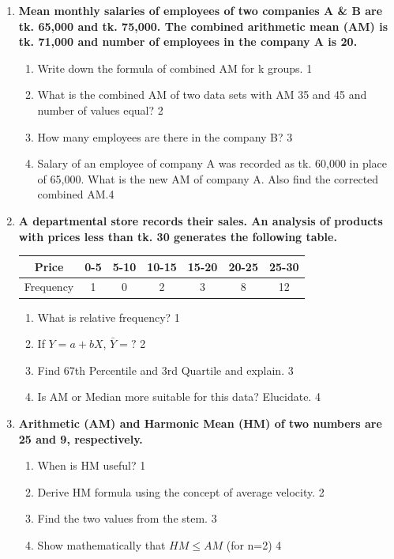 \documentclass[a4paper,oneside]{book}
\begin{document}
\begin{enumerate}
   \item
	  \textbf{Mean monthly salaries of employees of two companies A \& B are tk. 65,000 and tk. 75,000. The combined arithmetic mean (AM) is tk. 71,000 and number of employees in the company A is 20.} 
	  
  \begin{enumerate}
    \item
	Write down the formula of combined AM for k groups. \hfill 1
    \item
	What is the combined AM of two data sets with AM 35 and 45 and number of values equal? \hfill 2
    \item  
	How many employees are there in the company B? \hfill 3
    \item
	Salary of an employee of company A was recorded as tk. 60,000 in place of 65,000. What is the new AM of company A. Also find the corrected combined AM.\hfill 4
  \end{enumerate}

     \item
	  \textbf{A departmental store records their sales. An analysis of products with prices less than tk. 30 generates the following table.} 
	  
\begin{table}[h]
\centering
\begin{tabular}{c|c|c|c|c|c|c}
Price     & 0-5 & 5-10 & 10-15 & 15-20 & 20-25 & 25-30 \\ \hline
Frequency & 1   & 0    & 2     & 3     & 8     & 12   
\end{tabular}
\end{table}
  
  \begin{enumerate}
    \item
	What is relative frequency? \hfill 1
    \item
	If $Y = a + bX$, $\bar Y = ?$ \hfill 2
    \item  
	Find 67th Percentile and 3rd Quartile and explain. \hfill 3
    \item
	Is AM or Median more suitable for this data? Elucidate. \hfill 4
  \end{enumerate}

   \item
	  \textbf{Arithmetic (AM) and Harmonic Mean (HM) of two numbers are 25 and 9, respectively.} 
    \begin{enumerate}
    \item
	When is HM useful? \hfill 1
    \item
	Derive HM formula using the concept of average velocity. \hfill 2
    \item  
	Find the two values from the stem. \hfill 3
    \item
	Show mathematically that $HM \le AM$ (for n=2) \hfill 4
  \end{enumerate}


\end{enumerate}
\end{document}
